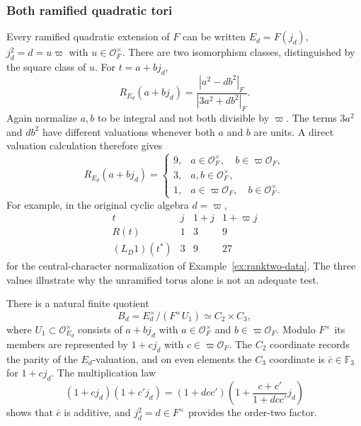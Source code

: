 \documentclass[11pt]{article}
\theoremstyle{plain}
\theoremstyle{definition}
\begin{document}
\subsubsection{Both ramified quadratic tori}
Every ramified quadratic extension of $F$ can be written
$E_d=F(j_d)$, $j_d^2=d=u\varpi$ with $u\in\mathcal O_F^\times$.
There are two isomorphism classes, distinguished by the square
class of $u$.  For $t=a+bj_d$,
\begin{equation}\label{eq:ramified-R}
 R_{E_d}(a+bj_d)
 =\frac{|a^2-db^2|_F}{|3a^2+db^2|_F}.
\end{equation}
Again normalize $a,b$ to be integral and not both divisible
by $\varpi$.  The terms $3a^2$ and $db^2$ have different
valuations whenever both $a$ and $b$ are units.  A direct
valuation calculation therefore gives
\begin{equation}\label{eq:ramified-values}
 R_{E_d}(a+bj_d)=
 \begin{cases}
 9,& a\in\mathcal O_F^\times,
       \quad b\in\varpi\mathcal O_F,\\
 3,& a,b\in\mathcal O_F^\times,\\
 1,& a\in\varpi\mathcal O_F,
       \quad b\in\mathcal O_F^\times.
 \end{cases}
\end{equation}
For example, in the original cyclic algebra $d=\varpi$,
\[
 \begin{array}{c|ccc}
 t&j&1+j&1+\varpi j\\\hline
 R(t)&1&3&9\\
 (L_D1)(t^*)&3&9&27
 \end{array}
\]
for the central-character normalization of Example~\ref{ex:ranktwo-data}.
The three values illustrate why the unramified torus alone is not
an adequate test.

There is a natural finite quotient
\[
 B_d=E_d^\times/(F^\times U_1)\simeq C_2\times C_3,
\]
where $U_1\subset\mathcal O_{E_d}^\times$ consists of
$a+bj_d$ with $a\in\mathcal O_F^\times$ and
$b\in\varpi\mathcal O_F$.  Modulo $F^\times$ its
members are represented by $1+cj_d$ with
$c\in\varpi\mathcal O_F$.  The $C_2$ coordinate
records the parity of the $E_d$-valuation, and on even elements
the $C_3$ coordinate is $\bar c\in\mathbb F_3$ for
$1+cj_d$.  The multiplication law
\[
 (1+cj_d)(1+c'j_d)
 =(1+dcc')\left(1+\frac{c+c'}{1+dcc'}j_d\right)
\]
shows that $\bar c$ is additive, and $j_d^2=d\in F^\times$
provides the order-two factor.
\end{document}
